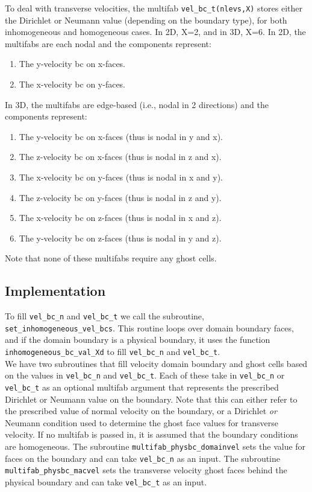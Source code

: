 \documentclass[final]{siamltex}
\begin{document}
To deal with transverse velocities, the multifab {\tt vel\_bc\_t(nlevs,X)} stores
either the Dirichlet or Neumann value (depending on the boundary type), for both 
inhomogeneous and homogeneous cases.  In 2D, X=2,
and in 3D, X=6.  In 2D, the multifabs are each nodal and the components represent:\\
\begin{enumerate}
\item The y-velocity bc on x-faces.
\item The x-velocity bc on y-faces.\\
\end{enumerate}

In 3D, the multifabs are edge-based (i.e., nodal in 2 directions)
and the components represent:\\
\begin{enumerate}
\item The y-velocity bc on x-faces (thus is nodal in y and x).
\item The z-velocity bc on x-faces (thus is nodal in z and x).
\item The x-velocity bc on y-faces (thus is nodal in x and y).
\item The z-velocity bc on y-faces (thus is nodal in z and y).
\item The x-velocity bc on z-faces (thus is nodal in x and z).
\item The y-velocity bc on z-faces (thus is nodal in y and z).\\
\end{enumerate}

Note that none of these multifabs require any ghost cells.\\

\subsection{Implementation}

To fill {\tt vel\_bc\_n} and {\tt vel\_bc\_t} we call the subroutine,
{\tt set\_inhomogeneous\_vel\_bcs}.  This routine loops over domain boundary
faces, and if the domain boundary is a physical boundary, it uses the
function {\tt inhomogeneous\_bc\_val\_Xd} to fill {\tt vel\_bc\_n} and 
{\tt vel\_bc\_t}.\\

We have two subroutines that fill velocity domain boundary and ghost cells based
on the values in {\tt vel\_bc\_n} and {\tt vel\_bc\_t}.
Each of these take in {\tt vel\_bc\_n} or {\tt vel\_bc\_t} as
an optional multifab argument that represents the prescribed Dirichlet
or Neumann value on the boundary.  Note that this can either refer to the 
prescribed value of normal velocity on the boundary, or a Dirichlet {\it or} 
Neumann condition used to determine the ghost face values for transverse velocity.
If no multifab is passed in, it is assumed that the boundary conditions
are homogeneous.  The subroutine {\tt multifab\_physbc\_domainvel} sets the 
value for faces on the boundary and can take {\tt vel\_bc\_n} as an input.
The subroutine {\tt multifab\_physbc\_macvel}
sets the transverse velocity ghost faces behind the physical boundary and
can take {\tt vel\_bc\_t} as an input.\\
\end{document}
